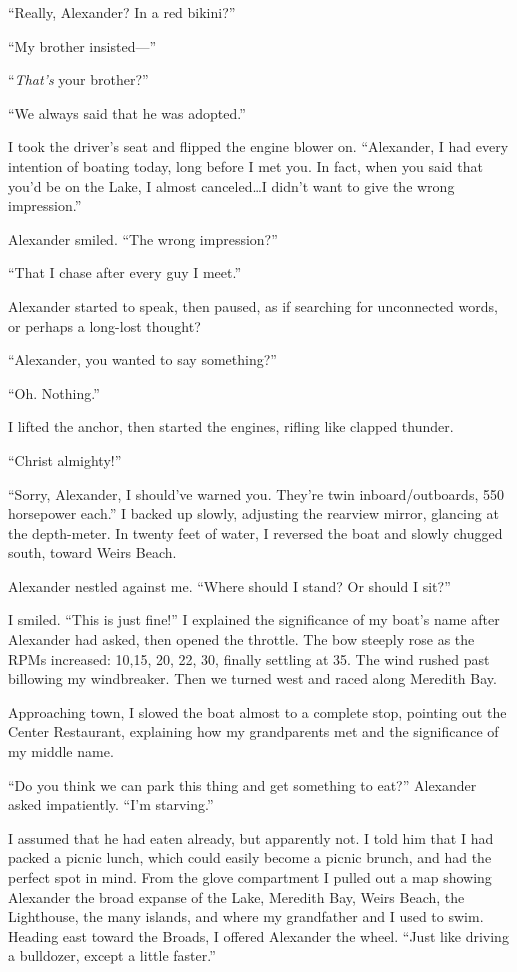 ``Really, Alexander? In a red bikini?''

``My brother insisted---''

``\emph{That's} your brother?''

``We always said that he was adopted.''

I took the driver's seat and flipped the engine blower on. ``Alexander,
I had every intention of boating today, long before I met you. In fact,
when you said that you'd be on the Lake, I almost canceled\ldots I
didn't want to give the wrong impression.''

Alexander smiled. ``The wrong impression?''

``That I chase after every guy I meet.''

Alexander started to speak, then paused, as if searching for unconnected
words, or perhaps a long-lost thought?

``Alexander, you wanted to say something?''

``Oh. Nothing.''

I lifted the anchor, then started the engines, rifling like clapped
thunder.

``Christ almighty!''

``Sorry, Alexander, I should've warned you. They're twin
\linebreak inboard/outboards, 550 horsepower each.'' I backed up slowly, adjusting
the rearview mirror, glancing at the depth-meter. In twenty feet of
water, I reversed the boat and slowly chugged south, toward Weirs Beach.

Alexander nestled against me. ``Where should I stand? Or should I sit?''

I smiled. ``This is just fine!'' I explained the significance of my
boat's name after Alexander had asked, then opened the throttle. The bow
steeply rose as the RPMs increased: 10,15, 20, 22, 30, finally settling
at 35. The wind rushed past billowing my windbreaker. Then we turned
west and raced along Meredith Bay.

Approaching town, I slowed the boat almost to a complete stop, pointing
out the Center Restaurant, explaining how my grandparents met and the
significance of my middle name.

``Do you think we can park this thing and get something to eat?''
Alexander asked impatiently. ``I'm starving.''

I assumed that he had eaten already, but apparently not. I told him that
I had packed a picnic lunch, which could easily become a picnic brunch,
and had the perfect spot in mind. From the glove compartment I pulled
out a map showing Alexander the broad expanse of the Lake, Meredith Bay,
Weirs Beach, the Lighthouse, the many islands, and where my grandfather
and I used to swim. Heading east toward the Broads, I offered Alexander
the wheel. ``Just like driving a bulldozer, except a little faster.''

